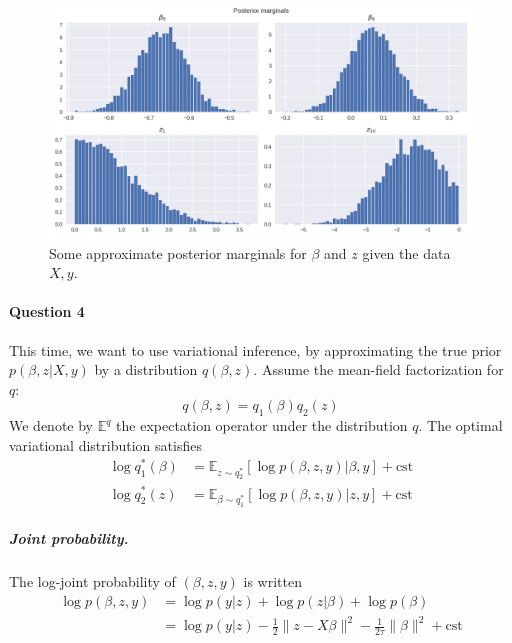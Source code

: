 \documentclass[11pt]{article}
\newcommand\EE{\mathbb{E}}
\begin{document}
\begin{figure}
	\centering
	\includegraphics[width=.9\linewidth]{images/posterior_distribution_gibbs.png}
	\caption{Some approximate posterior marginals for $\beta$ and $z$ given the data $X, y$.}\label{fig:GibbsMarginals}
\end{figure}


\paragraph{Question 4}

This time, we want to use variational inference, by approximating the true prior $p(\beta,z|X,y)$ by a distribution $q(\beta,z)$.
Assume the mean-field factorization for $q$:
\begin{equation}
	q(\beta, z) = q_1(\beta)q_2(z)
\end{equation}
We denote by $\EE^q$ the expectation operator under the distribution $q$. The optimal variational distribution satisfies
\begin{subequations}
\begin{align}
	\log q^*_1(\beta) &= \EE_{z\sim q^*_2}[\log p(\beta,z,y)|\beta,y] + \mathrm{cst}  \\
	\log q^*_2(z) &= \EE_{\beta\sim q^*_1}[\log p(\beta,z,y)|z,y] + \mathrm{cst}
\end{align}
\end{subequations}

\subparagraph{Joint probability.} The log-joint probability of $(\beta,z,y)$ is written
\begin{equation}
\begin{aligned}
	\log p(\beta, z, y)
	&= \log p(y | z) + \log p(z|\beta) + \log p(\beta)  \\
	&= 
	\log p(y|z)
	-\frac{1}{2}\|z-X\beta\|^2 - \frac{1}{2\tau} \|\beta\|^2 + \mathrm{cst}
\end{aligned}
\end{equation}
\end{document}
